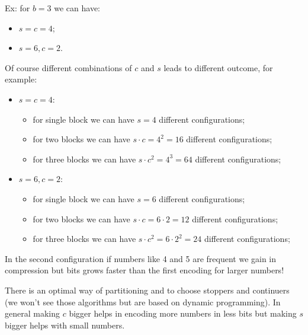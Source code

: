 Ex: for $b=3$ we can have:
\begin{itemize}
    \item $s = c = 4$;
    \item $s = 6, c = 2$.
\end{itemize}

Of course different combinations of $c$ and $s$ leads to different outcome, for example:
\begin{itemize}
    \item $s=c=4$:
    \begin{itemize}
        \item for single block we can have $s = 4$ different configurations;
        \item for two blocks we can have $s \cdot c = 4^2 = 16$ different configurations;
        \item for three blocks we can have $s \cdot c^2 = 4^3 = 64$ different configurations;
    \end{itemize}
    
    \item $s = 6, c = 2$:
    \begin{itemize}
        \item for single block we can have $s = 6$ different configurations;
        \item for two blocks we can have $s \cdot c = 6 \cdot 2 = 12$ different configurations;
        \item for three blocks we can have $s \cdot c^2 = 6 \cdot 2^2 = 24$ different configurations;
    \end{itemize}
\end{itemize}
In the second configuration if numbers like 4 and 5 are frequent we gain in compression but bits grows faster than the first encoding for larger numbers!

There is an optimal way of partitioning and to choose stoppers and continuers (we won't see those algorithms but are based on dynamic programming).
In general making $c$ bigger helps in encoding more numbers in less bits but making $s$ bigger helps with small numbers.

